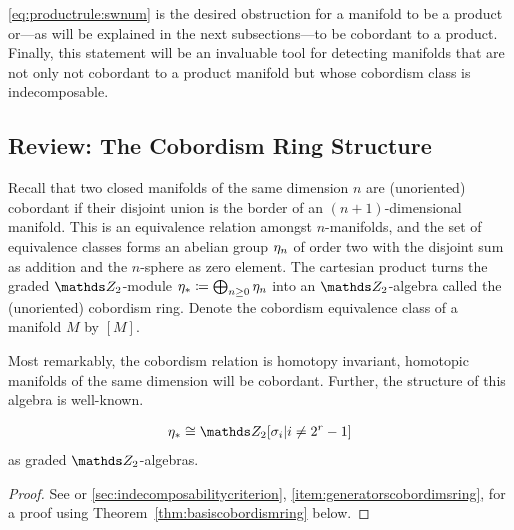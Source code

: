 \autoref{eq:productrule:swnum} is the desired obstruction for
a manifold to be a product or---as will be explained in the next
subsections---to be cobordant to a product.
Finally, this statement will be an invaluable tool for detecting
manifolds that are not only not cobordant to a product manifold but
whose cobordism class is indecomposable.

\subsection{Review: The Cobordism Ring Structure}
\label{sec:cobordismringstructure}
Recall that two closed manifolds of the same dimension $n$ are
(unoriented) cobordant if their disjoint union is the border of an
$(n+1)$-dimensional manifold.
This is an equivalence relation amongst $n$-manifolds, and the
set of equivalence classes forms an abelian group $\eta_n$ of order two
with the disjoint sum as addition and the $n$-sphere as zero element.
The cartesian product turns the graded $\Zmod2$-module
$\eta_*\coloneqq \bigoplus_{n\geq 0}\eta_n$ into an $\Zmod2$-algebra
called the (unoriented) cobordism ring.
Denote the cobordism equivalence class of a manifold $M$ by $[M]$.

Most remarkably, the cobordism relation is homotopy invariant, \idest
homotopic manifolds of the same dimension will be cobordant.
Further, the structure of this algebra is well-known.
\begin{Thm}[Thom]\label{thm:cobordismringstructure}
  \begin{gather*}
    \c_*
    \cong \Zmod2[\sigma_i| i\neq 2^r-1]
  \end{gather*}
  as graded $\Zmod2$-algebras.
  \begin{proof}
    See \cite[Theorem~IV.12]{thom} or
    \autoref{sec:indecomposabilitycriterion},
    \ref{item:generatorscobordimsring}, for a proof using
    Theorem~\autoref{thm:basiscobordismring} below.
  \end{proof}
\end{Thm}

